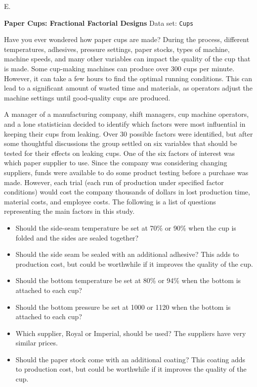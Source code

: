 \documentclass[
]{report}
\newcounter{excount}
\renewcommand{\theexcount}{E\arabic{excount}}
\begin{document}
\begin{list}{\theexcount.}{ \setlength{\itemsep}{1.2em}}
  \item \textbf{Paper Cups: Fractional Factorial Designs}
  Data set: \texttt{Cups}

Have you ever wondered how paper cups are made? During the process, different temperatures, adhesives, pressure settings, paper stocks, types of machine, machine speeds, and many other variables can impact the quality of the cup that is made. Some cup-making machines can produce over 300 cups per minute. However, it can take a few hours to find the optimal running conditions. This can lead to a significant amount of wasted time and materials, as operators adjust the machine settings until good-quality cups are produced.

A manager of a manufacturing company, shift managers, cup machine operators, and a lone statistician decided to identify which factors were most influential in keeping their cups from leaking. Over 30 possible factors were identified, but after some thoughtful discussions the group settled on six variables that should be tested for their effects on leaking cups. One of the six factors of interest was which paper supplier to use. Since the company was considering changing suppliers, funds were available to do some product testing before a purchase was made. However, each trial (each run of production under specified factor conditions) would cost the company thousands of dollars in lost production time, material costs, and employee costs. The following is a list of questions representing the main factors in this study.

  \begin{itemize}
    \item Should the side-seam temperature be set at 70\% or 90\% when the cup is folded and the sides are sealed together?
    \item Should the side seam be sealed with an additional adhesive? This adds to production cost, but could be worthwhile if it improves the quality of the cup.
    \item Should the bottom temperature be set at 80\% or 94\% when the bottom is attached to each cup?
    \item Should the bottom pressure be set at 1000 or 1120 when the bottom is attached to each cup?
    \item Which supplier, Royal or Imperial, should be used? The suppliers have very similar prices.
    \item Should the paper stock come with an additional coating? This coating adds to production cost, but could be worthwhile if it improves the quality of the cup.
    \end{itemize}


\end{list}
\end{document}
